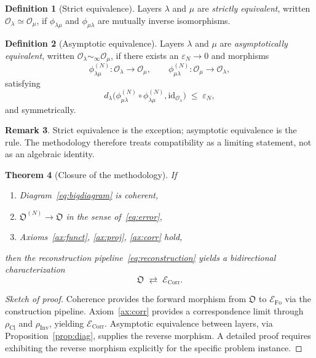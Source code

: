 \documentclass[11pt,a4paper]{article}
\theoremstyle{definition}
\newtheorem{definition}{Definition}[section]
\newtheorem{remark}[definition]{Remark}
\theoremstyle{plain}
\newtheorem{theorem}[definition]{Theorem}
\newcommand{\Fo}{\mathrm{Fo}}
\newcommand{\Cl}{\mathrm{Cl}}
\newcommand{\Corr}{\mathrm{Corr}}
\newcommand{\Inv}{\mathrm{Inv}}
\newcommand{\Ob}{\mathfrak{O}}
\newcommand{\Ecal}{\mathcal{E}}
\newcommand{\Ocal}{\mathcal{O}}
\newcommand{\philam}{\phi_{\lambda\mu}}
\begin{document}
\begin{definition}[Strict equivalence]
Layers $\lambda$ and $\mu$ are \emph{strictly equivalent}, written
$\Ocal_\lambda \simeq \Ocal_\mu$, if $\philam$ and $\phi_{\mu\lambda}$
are mutually inverse isomorphisms.
\end{definition}

\begin{definition}[Asymptotic equivalence]
Layers $\lambda$ and $\mu$ are \emph{asymptotically equivalent},
written $\Ocal_\lambda \sim_\infty \Ocal_\mu$, if there exists an
$\varepsilon_N \to 0$ and morphisms
\[
  \philam^{(N)} : \Ocal_\lambda \to \Ocal_\mu , \qquad
  \phi_{\mu\lambda}^{(N)} : \Ocal_\mu \to \Ocal_\lambda ,
\]
satisfying
\[
  d_\lambda\bigl(\phi_{\mu\lambda}^{(N)} \circ \philam^{(N)}, \mathrm{id}_{\Ocal_\lambda}\bigr)
  \;\leq\; \varepsilon_N ,
\]
and symmetrically.
\end{definition}

\begin{remark}
Strict equivalence is the exception; asymptotic equivalence is the
rule. The methodology therefore treats compatibility as a limiting
statement, not as an algebraic identity.
\end{remark}

\begin{theorem}[Closure of the methodology]\label{thm:closure}
If
\begin{enumerate}[label=(\roman*)]
  \item Diagram~\eqref{eq:bigdiagram} is coherent,
  \item $\Ob^{(N)} \to \Ob$ in the sense of~\eqref{eq:error},
  \item Axioms~\ref{ax:funct}, \ref{ax:proj}, \ref{ax:corr} hold,
\end{enumerate}
then the reconstruction pipeline~\eqref{eq:reconstruction} yields a
bidirectional characterization
\[
  \Ob \;\rightleftarrows\; \Ecal_\Corr .
\]
\end{theorem}

\begin{proof}[Sketch of proof]
Coherence provides the forward morphism from $\Ob$ to $\Ecal_\Fo$ via
the construction pipeline. Axiom~\ref{ax:corr} provides a
correspondence limit through $\rho_\Cl$ and $\rho_\Inv$, yielding
$\Ecal_\Corr$. Asymptotic equivalence between layers, via
Proposition~\ref{prop:diag}, supplies the reverse morphism. A
detailed proof requires exhibiting the reverse morphism explicitly for
the specific problem instance.
\end{proof}
\end{document}
